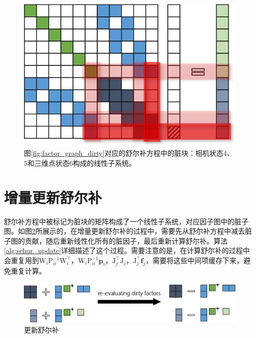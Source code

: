 

\begin{figure}[htb!]
    \centering
    \includegraphics[scale=1]{figs/normal_eq_dirty.png}
    \caption{图\ref{fig:factor_graph_dirty}对应的舒尔补方程中的脏块：相机状态$4$、$5$和三维点状态$6$构成的线性子系统。}
    \label{fig:normal_eq_dirty}
\end{figure}

\section{增量更新舒尔补}

舒尔补方程中被标记为脏块的矩阵构成了一个线性子系统，对应因子图中的脏子图。如图\ref{fig:schur_update}所展示的，在增量更新舒尔补的过程中，需要先从舒尔补方程中减去脏子图的贡献，随后重新线性化所有的脏因子，最后重新计算舒尔补。算法\ref{alg:schur_update}详细描述了这个过程。需要注意的是，在计算舒尔补的过程中会重复用到$\mathrm{W}_i\mathrm{P}_{ii}^{-1}\mathrm{W}_i^\top$，$\mathrm{W}_i\mathrm{P}_{ii}^{-1}\bm{p}_i$，$\mathrm{J}_j^\top\mathrm{J}_j$，$\mathrm{J}_j^\top\bm{f}_j$，需要将这些中间项缓存下来，避免重复计算。



\begin{figure}[htb!]
    \centering
    \includegraphics[width=\textwidth]{figs/schur_update.png}
    \caption{更新舒尔补}
    \label{fig:schur_update}
\end{figure}

